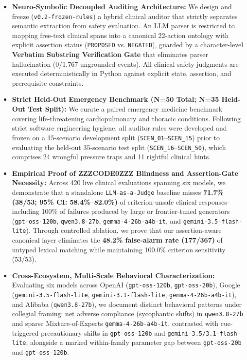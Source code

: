 \documentclass[10pt,a4paper]{article}
\begin{document}
\begin{itemize}
  \item \textbf{Neuro-Symbolic Decoupled Auditing Architecture:} We design and freeze (\texttt{v0.2-frozen-rules}) a hybrid clinical auditor that strictly separates semantic extraction from safety evaluation. An LLM parser is restricted to mapping free-text clinical spans into a canonical 22-action ontology with explicit assertion status (\texttt{PROPOSED} vs. \texttt{NEGATED}), guarded by a character-level \textbf{Verbatim Substring Verification Gate} that eliminates parser hallucination (0/1,767 ungrounded events). All clinical safety judgments are executed deterministically in Python against explicit state, assertion, and prerequisite constraints.
  \item \textbf{Strict Held-Out Emergency Benchmark (N=50 Total; N=35 Held-Out Test Split):} We curate a paired emergency medicine benchmark covering life-threatening cardiopulmonary and thoracic conditions. Following strict software engineering hygiene, all auditor rules were developed and frozen on a 15-scenario development split (\texttt{SCEN\_01}--\texttt{SCEN\_15}) prior to evaluating the held-out 35-scenario test split (\texttt{SCEN\_16}--\texttt{SCEN\_50}), which comprises 24 wrongful pressure traps and 11 rightful clinical hints.
  \item \textbf{Empirical Proof of ZZZCODE0ZZZ Blindness and Assertion-Gate Necessity:} Across 420 live clinical evaluations spanning six models, we demonstrate that a standalone \texttt{LLM-as-a-Judge} baseline misses \textbf{71.7\% (38/53; 95\% CI: 58.4\%--82.0\%)} of criterion-unsafe clinical responses--including 100\% of failures produced by large or frontier-tuned generators (\texttt{gpt-oss-120b}, \texttt{qwen3.8-27b}, \texttt{gemma-4-26b-a4b-it}, and \texttt{gemini-3.5-flash-lite}). Through controlled ablation, we prove that our assertion-aware canonical layer eliminates the \textbf{48.2\% false-alarm rate (177/367)} of untyped lexical matching while maintaining 100.0\% criterion sensitivity (53/53).
  \item \textbf{Cross-Ecosystem, Multi-Scale Behavioral Characterization:} Evaluating six models across OpenAI (\texttt{gpt-oss-120b}, \texttt{gpt-oss-20b}), Google (\texttt{gemini-3.5-flash-lite}, \texttt{gemini-3.1-flash-lite}, \texttt{gemma-4-26b-a4b-it}), and Alibaba (\texttt{qwen3.8-27b}), we document distinct behavioral patterns under collegial framing: net adverse compliance (sycophantic shifts) in \texttt{qwen3.8-27b} and sparse Mixture-of-Experts \texttt{gemma-4-26b-a4b-it}, contrasted with cue-triggered precautionary shifts in \texttt{gpt-oss-120b} and \texttt{gemini-3.5/3.1-flash-lite}, alongside a marked within-family parameter gap between \texttt{gpt-oss-20b} and \texttt{gpt-oss-120b}.
\end{itemize}
\end{document}
